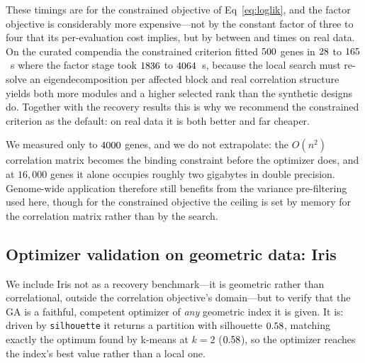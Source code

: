 These timings are for the constrained objective of Eq~\eqref{eq:loglik}, and the
factor objective is considerably more expensive---not by the constant factor of
three to four that its per-evaluation cost implies, but by between \SaelensCostRatioMin{} and \SaelensCostRatioMax{} times on real data. On the curated compendia the constrained criterion fitted $500{}$ genes in $28{}$ to $165{}$~s where the factor stage took $1836{}$ to $4064{}$~s, because the local search must re-solve an eigendecomposition
per affected block and real correlation structure yields both more modules and a
higher selected rank than the synthetic designs do. Together with the recovery
results this is why we recommend the constrained criterion as the default: on
real data it is both better and far cheaper.

We measured only to $4000{}$ genes, and we do not extrapolate: the
$O(n^2)$ correlation matrix becomes the binding constraint before the optimizer
does, and at $16{,}000$ genes it alone occupies roughly two gigabytes in double
precision. Genome-wide application therefore still benefits from the variance
pre-filtering used here, though for the constrained objective the ceiling is set
by memory for the correlation matrix rather than by the search.

\begin{table}[!ht]
\centering
\caption{\textbf{Runtime scaling} (seconds per dataset, mean of three
replicates). Recovery is unaffected by size across this range.}
\label{tab:scaling}
\end{table}

\subsection*{Optimizer validation on geometric data: Iris}
We include Iris not as a recovery benchmark---it is geometric rather than
correlational, outside the correlation objective's domain---but to verify that
the GA is a faithful, competent optimizer of \emph{any} geometric index it is
given. It is: driven by \texttt{silhouette} it returns a partition with
silhouette $0.58{}$, matching exactly the optimum found by k-means at
$k=2$ ($0.58{}$), so the optimizer reaches the index's best value rather
than a local one.

